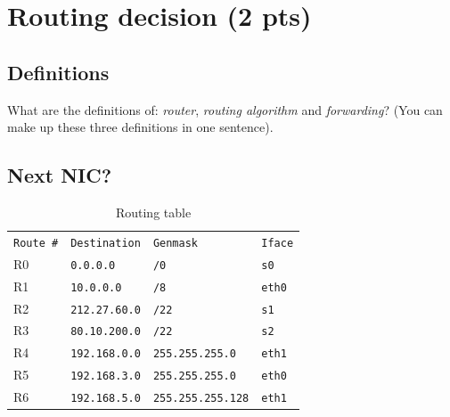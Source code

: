 \documentclass[11pt]{article}
\begin{document}
\section{Routing decision (2 pts)}
	\subsection{Definitions}
		What are the definitions of: \emph{router}, \emph{routing algorithm} and \emph{forwarding}? (You can make up these three definitions in one sentence).%
\vspace{3cm}

	\subsection{Next NIC?}
		\begin{table}[h]
		  \centering
		      \begin{tabular}{llll}
		      		\verb+Route #+	&	\verb+Destination+	& \verb+Genmask+		& \verb+Iface+ \\
		      		R0				&	\verb+0.0.0.0+ 		& \verb+/0+		 		& \verb+s0+ \\
		      		R1				&	\verb+10.0.0.0+		& \verb+/8+				& \verb+eth0+ \\
		      		R2				&	\verb+212.27.60.0+	& \verb+/22+			& \verb+s1+ \\
		      		R3				&	\verb+80.10.200.0+	& \verb+/22+			& \verb+s2+ \\
		      		R4				&	\verb+192.168.0.0+	& \verb+255.255.255.0+	& \verb+eth1+ \\
		      		R5				&	\verb+192.168.3.0+	& \verb+255.255.255.0+	& \verb+eth0+ \\
		      		R6				&	\verb+192.168.5.0+	& \verb+255.255.255.128+& \verb+eth1+ \\
		      \end{tabular}
		      \caption{Routing table}
		  \label{tab:routing}
		\end{table}
\end{document}
